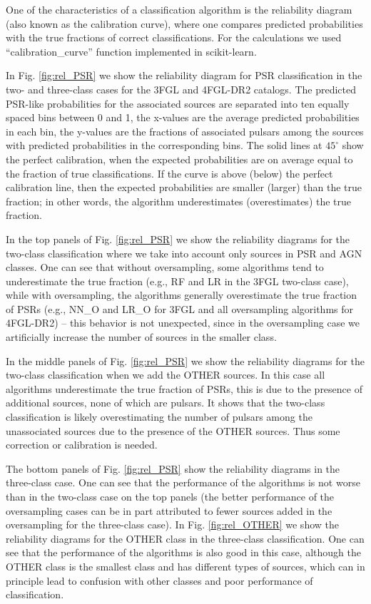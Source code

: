\documentclass[referee]{aa} %
\begin{document}
\begin{appendix}
One of the characteristics of a classification algorithm is the reliability diagram (also known as the calibration curve),
where one compares predicted probabilities with the true fractions of correct classifications.
For the calculations we used ``calibration\_curve'' function implemented in scikit-learn.

In Fig. \ref{fig:rel_PSR} we show the reliability diagram for PSR classification in the two- and three-class cases
for the 3FGL and 4FGL-DR2 catalogs.
The predicted PSR-like probabilities for the associated sources are separated into ten equally spaced bins between 0 and 1, 
the x-values are the average predicted probabilities in each bin,
the y-values are the fractions of associated pulsars among the sources with predicted probabilities 
in the corresponding bins.
The solid lines at $45^\circ$ show the perfect calibration, when the expected probabilities are on average equal to the 
fraction of true classifications.
If the curve is above (below) the perfect calibration line, then the expected probabilities are smaller (larger) than the true fraction; in other words, the algorithm underestimates (overestimates) the true fraction.


In the top panels of Fig. \ref{fig:rel_PSR} we show the reliability diagrams for the two-class classification
where we take into account only sources in PSR and AGN classes.
One can see that without oversampling, some algorithms tend to underestimate the true fraction (e.g., RF and LR in the 3FGL two-class case),
while with oversampling, the algorithms generally overestimate the true fraction of PSRs (e.g., NN\_O and LR\_O for 3FGL and all oversampling algorithms for 4FGL-DR2) -- this behavior is not unexpected, since in the oversampling case we artificially increase the number of sources in the smaller class.

In the middle panels of Fig. \ref{fig:rel_PSR} we show the reliability diagrams  for the two-class classification
when we add the OTHER sources.
In this case all algorithms underestimate the true fraction of PSRs, this is due to the presence of additional sources,
none of which are pulsars.
It shows that the two-class classification is likely overestimating the number of pulsars among the unassociated sources
due to the presence of the OTHER sources.
Thus some correction or calibration is needed.

The bottom panels of Fig. \ref{fig:rel_PSR} show the reliability diagrams in the three-class case.
One can see that the performance of the algorithms is not worse than in the two-class case on the top panels
(the better performance of the oversampling cases can be in part attributed to fewer sources added in the oversampling
for the three-class case).
In Fig. \ref{fig:rel_OTHER} we show the reliability diagrams for the OTHER class in the three-class classification.
One can see that the performance of the algorithms is also good in this case, although the OTHER class is the smallest class
and has different types of sources, which can in principle lead to confusion with other classes
and poor performance of classification.


\end{appendix}
\end{document}
